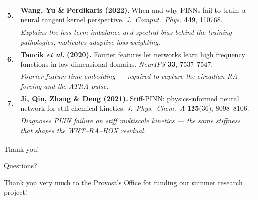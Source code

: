 \documentclass[aspectratio=169,11pt]{beamer}
\newcommand{\refnum}[1]{\textcolor{SAblue}{\bfseries #1}}
\newcommand{\refwhy}[1]{{\itshape\color{SAgrey}#1}}
\begin{document}
\begin{frame}[plain]
\begin{minipage}{0.965\textwidth}
\begin{textcard}[left=16pt,right=16pt,top=10pt,bottom=10pt]
\begin{tabular}{@{}p{0.5cm}@{}p{\dimexpr\linewidth-0.5cm\relax}@{}}
        \refnum{5.} & \textbf{Wang, Yu \& Perdikaris (2022).}
          When and why PINNs fail to train: a neural tangent kernel perspective.
          \emph{J.\ Comput.\ Phys.} \textbf{449}, 110768.\\[1pt]
        & \refwhy{Explains the loss-term imbalance and spectral bias behind the training pathologies; motivates adaptive loss weighting.}\\[3.5pt]

        \refnum{6.} & \textbf{Tancik \emph{et al.} (2020).}
          Fourier features let networks learn high frequency functions in low
          dimensional domains. \emph{NeurIPS} \textbf{33}, 7537--7547.\\[1pt]
        & \refwhy{Fourier-feature time embedding --- required to capture the circadian RA forcing and the ATRA pulse.}\\[3.5pt]

        \refnum{7.} & \textbf{Ji, Qiu, Zhang \& Deng (2021).}
          Stiff-PINN: physics-informed neural network for stiff chemical kinetics.
          \emph{J.\ Phys.\ Chem.\ A} \textbf{125}(36), 8098--8106.\\[1pt]
        & \refwhy{Diagnoses PINN failure on stiff multiscale kinetics --- the same stiffness that shapes the WNT--RA--HOX residual.}\\
      \end{tabular}
    \end{textcard}
  \end{minipage}
\end{frame}

\begin{frame}[plain]
  \cornermark
  \vspace{1.7cm}
  \centering
  {\fontsize{24}{29}\selectfont\color{Snow}Thank you!\par}
  \vspace{0.35cm}
  {\fontsize{13}{17}\selectfont\color{Snow}Questions?\par}
  \vspace{0.9cm}
  {\fontsize{11.5}{15}\selectfont\color{Snow}%
   Thank you very much to the \colorbox{Mint}{\textcolor{Ink}{Provost's Office}}
   for funding our summer research project!\par}
\end{frame}
\end{document}
